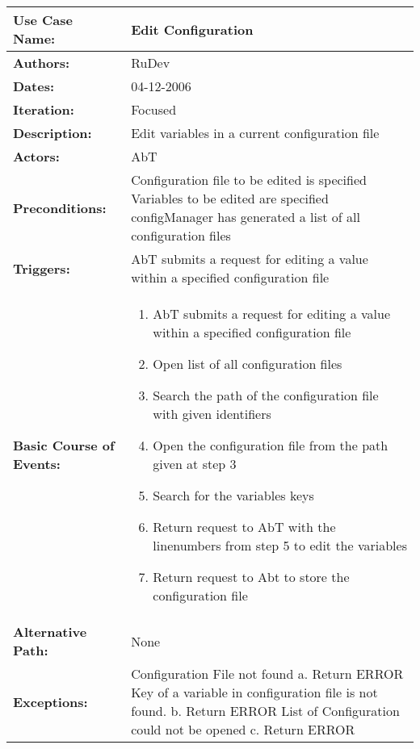 \begin{tabularx}{\linewidth}{|l|X|}
\hline
\textbf{Use Case Name:} & \textbf{Edit Configuration} \\
\hline
\textbf{Authors:} & RuDev \\
\hline
\textbf{Dates:} & 04-12-2006 \\
\hline
\textbf{Iteration:} & Focused \\
\hline
\textbf{Description:} & Edit variables in a current configuration file\\
\hline
\textbf{Actors:} & AbT \\
\hline
\textbf{Preconditions:} & Configuration file to be edited is specified \newline Variables to be edited are specified \newline configManager has generated a list of all configuration files \\
\hline
\textbf{Triggers:} & AbT submits a request for editing a value within a specified configuration file \\
\hline
\textbf{Basic Course of Events:} & 
\begin{minipage}{\linewidth} 
  \vspace{0.05em}
  \begin{enumerate}
   \item AbT submits a request for editing a value within a specified configuration file
   \item Open list of all configuration files
   \item Search the path of the configuration file with given identifiers
   \item Open the configuration file from the path given at step 3
   \item Search for the variables keys
   \item Return request to AbT with the linenumbers from step 5 to edit the variables
   \item Return request to Abt to store the configuration file
  \end{enumerate}
  \vspace{0.05em}
\end{minipage}
\\
\hline 
\textbf{Alternative Path:} & None  \\
\hline
\textbf{Exceptions:} & Configuration File not found \newline a. Return ERROR \newline\newline Key of a variable in configuration file is not found. \newline b. Return ERROR \newline\newline List of Configuration could not be opened \newline c. Return ERROR \\

\end{tabularx}
